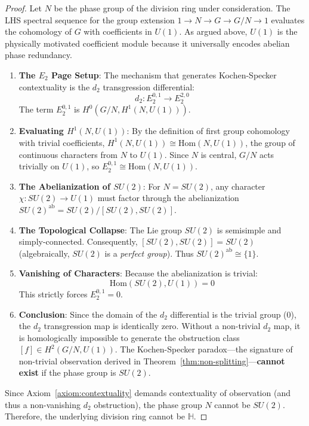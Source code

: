 \documentclass[11pt]{article}
\begin{document}
\begin{proof}
Let $N$ be the phase group of the division ring under consideration. The LHS spectral sequence for the group extension $1 \to N \to G \to G/N \to 1$ evaluates the cohomology of $G$ with coefficients in $U(1)$. As argued above, $U(1)$ is the physically motivated coefficient module because it universally encodes abelian phase redundancy.

\begin{enumerate}
\item \textbf{The $E_2$ Page Setup}: The mechanism that generates Kochen-Specker contextuality is the $d_2$ transgression differential:
\[
d_2: E_2^{0,1} \longrightarrow E_2^{2,0}
\]
The term $E_2^{0,1}$ is $H^0(G/N, H^1(N, U(1)))$.

\item \textbf{Evaluating $H^1(N, U(1))$}: By the definition of first group cohomology with trivial coefficients, $H^1(N, U(1)) \cong \mathrm{Hom}(N, U(1))$, the group of continuous characters from $N$ to $U(1)$. Since $N$ is central, $G/N$ acts trivially on $U(1)$, so $E_2^{0,1} \cong \mathrm{Hom}(N, U(1))$.

\item \textbf{The Abelianization of $SU(2)$}: For $N = SU(2)$, any character $\chi: SU(2) \to U(1)$ must factor through the abelianization $SU(2)^{\text{ab}} = SU(2)/[SU(2), SU(2)]$.

\item \textbf{The Topological Collapse}: The Lie group $SU(2)$ is semisimple and simply-connected. Consequently, $[SU(2), SU(2)] = SU(2)$ (algebraically, $SU(2)$ is a \textit{perfect group}). Thus $SU(2)^{\text{ab}} \cong \{1\}$.

\item \textbf{Vanishing of Characters}: Because the abelianization is trivial:
\[
\mathrm{Hom}(SU(2), U(1)) = 0
\]
This strictly forces $E_2^{0,1} = 0$.

\item \textbf{Conclusion}: Since the domain of the $d_2$ differential is the trivial group ($0$), the $d_2$ transgression map is identically zero. Without a non-trivial $d_2$ map, it is homologically impossible to generate the obstruction class $[f] \in H^2(G/N, U(1))$. The Kochen-Specker paradox---the signature of non-trivial observation derived in Theorem~\ref{thm:non-splitting}---\textbf{cannot exist} if the phase group is $SU(2)$.
\end{enumerate}

Since Axiom~\ref{axiom:contextuality} demands contextuality of observation (and thus a non-vanishing $d_2$ obstruction), the phase group $N$ cannot be $SU(2)$. Therefore, the underlying division ring cannot be $\mathbb{H}$.
\end{proof}
\end{document}
